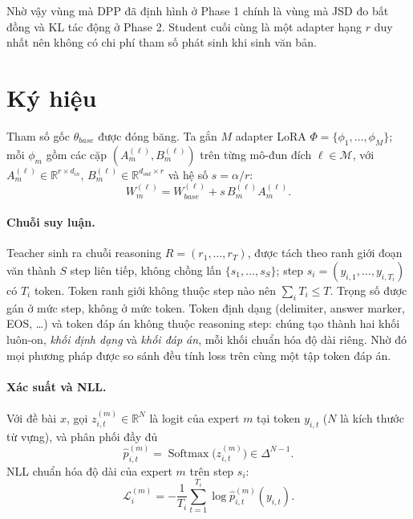 \documentclass[12pt,a4paper]{article}
\theoremstyle{plain}
\DeclareMathOperator{\Softmax}{Softmax}
\begin{document}
Nhờ vậy vùng mà DPP đã định hình ở Phase 1 chính là vùng mà JSD đo bất đồng và KL tác động ở Phase 2. Student cuối cùng là một adapter hạng $r$ duy nhất nên không có chi phí tham số phát sinh khi sinh văn bản.

\section{Ký hiệu}
\label{sec:notation}

Tham số gốc $\theta_{base}$ được đóng băng. Ta gắn $M$ adapter LoRA $\Phi=\{\phi_1,\dots,\phi_M\}$; mỗi $\phi_m$ gồm các cặp $(A_m^{(\ell)},B_m^{(\ell)})$ trên từng mô-đun đích $\ell\in\mathcal M$, với $A_m^{(\ell)}\in\mathbb R^{r\times d_{in}}$, $B_m^{(\ell)}\in\mathbb R^{d_{out}\times r}$ và hệ số $s=\alpha/r$:
\begin{equation}
W^{(\ell)}_m = W^{(\ell)}_{base} + s\,B_m^{(\ell)}A_m^{(\ell)}.
\end{equation}

\paragraph{Chuỗi suy luận.}
Teacher sinh ra chuỗi reasoning $R=(r_1,\dots,r_T)$, được tách theo ranh giới đoạn văn thành $S$ step liên tiếp, không chồng lấn $\{s_1,\dots,s_S\}$; step $s_i=(y_{i,1},\dots,y_{i,T_i})$ có $T_i$ token. Token ranh giới không thuộc step nào nên $\sum_iT_i\le T$. Trọng số được gán ở mức step, không ở mức token. Token định dạng (delimiter, answer marker, EOS, \ldots) và token đáp án không thuộc reasoning step: chúng tạo thành hai khối luôn-on, \emph{khối định dạng} và \emph{khối đáp án}, mỗi khối chuẩn hóa độ dài riêng. Nhờ đó mọi phương pháp được so sánh đều tính loss trên cùng một tập token đáp án.

\paragraph{Xác suất và NLL.}
Với đề bài $x$, gọi $z^{(m)}_{i,t}\in\mathbb R^{N}$ là logit của expert $m$ tại token $y_{i,t}$ ($N$ là kích thước từ vựng), và phân phối đầy đủ
\begin{equation}
\label{eq:phat}
\hat p^{(m)}_{i,t}=\Softmax\!\big(z^{(m)}_{i,t}\big)\in\Delta^{N-1}.
\end{equation}
NLL chuẩn hóa độ dài của expert $m$ trên step $s_i$:
\begin{equation}
\label{eq:nll}
\mathcal L_i^{(m)}=-\frac1{T_i}\sum_{t=1}^{T_i}\log \hat p^{(m)}_{i,t}(y_{i,t}).
\end{equation}
\end{document}
